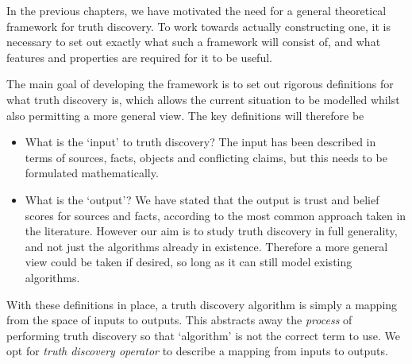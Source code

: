 \documentclass[../main.tex]{subfiles}
\begin{document}
In the previous chapters, we have motivated the need for a general theoretical
framework for truth discovery. To work towards actually constructing one, it is
necessary to set out exactly what such a framework will consist of, and what
features and properties are required for it to be useful.

The main goal of developing the framework is to set out rigorous definitions
for what truth discovery is, which allows the current situation to be modelled
whilst also permitting a more general view. The key definitions will therefore
be
\begin{itemize}
\item What is the `input' to truth discovery? The input has been described in
terms of sources, facts, objects and conflicting claims, but this needs to be
formulated mathematically.

\item What is the `output'? We have stated that the output is trust and belief
scores for sources and facts, according to the most common approach taken in
the literature. However our aim is to study truth discovery in full generality,
and not just the algorithms already in existence. Therefore a more general view
could be taken if desired, so long as it can still model existing algorithms.

\end{itemize}

With these definitions in place, a truth discovery algorithm is simply a
mapping from the space of inputs to outputs. This abstracts away the
\emph{process} of performing truth discovery so that `algorithm' is not the
correct term to use. We opt for \emph{truth discovery operator} to describe a
mapping from inputs to outputs.
\end{document}
